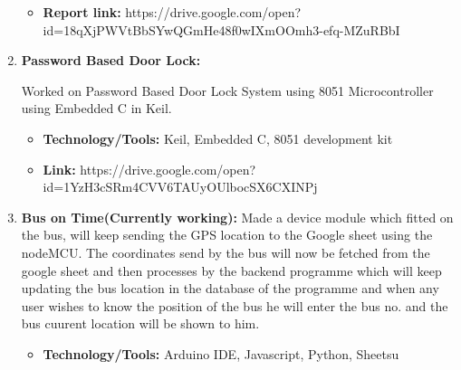 \documentclass[letterpaper,11pt]{article}
\begin{document}
\begin{enumerate}
\begin{itemize}
\item \textbf{Report link:} https://drive.google.com/open?id=18qXjPWVtBbSYwQGmHe48f0wIXmOOmh3-efq-MZuRBbI
\end{itemize}

 \item \textbf {Password Based Door Lock:}

Worked on Password Based Door Lock System using 8051 Microcontroller using Embedded C in Keil. 
\begin{itemize}
\item \textbf{Technology/Tools:} Keil, Embedded C, 8051 development kit
\end{itemize}

\begin{itemize}
\item \textbf{Link:} https://drive.google.com/open?id=1YzH3cSRm4CVV6TAUyOUlbocSX6CXINPj
\end{itemize}



\item \textbf{Bus on Time(Currently working):}
 Made a device module which fitted on the bus, will keep sending the GPS location to the Google sheet using the nodeMCU. The coordinates send by the bus will now be fetched from the google sheet and then processes by the backend programme which will keep updating the bus location in the database of the programme and when any user wishes to know the position of the bus he will enter the bus no. and the bus cuurent location will be shown to him. 
\begin{itemize}
\item \textbf{Technology/Tools:} Arduino IDE, Javascript, Python, Sheetsu
\end{itemize}

 \end{enumerate}
\end{document}
